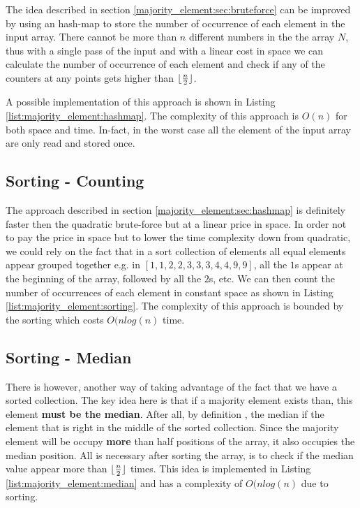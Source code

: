 The idea described in section \ref{majority_element:sec:bruteforce} can be improved by using an hash-map to store the number of occurrence of each element in the input array. There cannot be more than $n$ different numbers in the the array $N$, thus with a single pass of the input and with a linear cost in space we can calculate the number of occurrence of each element and check if any of the counters at any points gets higher than $\lfloor\frac{n}{2}\rfloor$.

A possible implementation of this approach is shown in Listing \ref{list:majority_element:hashmap}.
The complexity of this approach is $O(n)$ for both space and time. In-fact, in the worst case all the element of the input array are only read and stored once.



\subsection{Sorting - Counting}
\label{majority_element:sec:sorting}
The approach described in section \ref{majority_element:sec:hashmap} is definitely faster then the quadratic brute-force but at a linear price in space. In order not to pay the price in space but to lower the time complexity down from quadratic, we could rely on the fact that in a sort collection of elements all equal elements appear grouped together e.g. in $[1,1,2,2,3,3,3,4,4,9,9]$, all the $1$s appear at the beginning of the array, followed by all the $2$s, etc. We can then count the number of occurrences of each element in constant space as shown in Listing \ref{list:majority_element:sorting}. The complexity of this approach is bounded by the sorting which costs $O(nlog(n)$ time.



\subsection{Sorting - Median}
\label{majority_element:sec:median}
There is however, another way of taking advantage of the fact that we have a sorted collection. The key idea here is that if a majority element exists than, this element \textbf{must be the median}. After all, by definition , the median if the element that is right in the middle of the sorted collection. Since the majority element will be occupy \textbf{more} than half positions of the array, it also occupies the median position.
All is necessary after sorting the array, is to check if the median value appear more than $\lfloor\frac{n}{2}\rfloor$ times. 
This idea is implemented in Listing \ref{list:majority_element:median} and has a complexity of $O(nlog(n)$ due to sorting.

